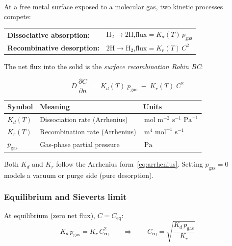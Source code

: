 \documentclass[11pt,a4paper]{article}
\newcommand{\pder}[2]{\frac{\partial #1}{\partial #2}}
\newcommand{\mol}{\,\text{mol}}
\newcommand{\m}{\,\text{m}}
\newcommand{\s}{\,\text{s}}
\newcommand{\Pa}{\,\text{Pa}}
\begin{document}
At a free metal surface exposed to a molecular gas, two kinetic processes
compete:

\begin{center}
\begin{tabular}{ll}
\textbf{Dissociative absorption:} & H$_2 \to 2$H,\quad $\text{flux} = K_d(T)\,p_\text{gas}$ \\
\textbf{Recombinative desorption:} & $2\text{H} \to \text{H}_2$,\quad $\text{flux} = K_r(T)\,C^2$ \\
\end{tabular}
\end{center}

The net flux into the solid is the \emph{surface recombination Robin BC}:

\begin{tcolorbox}[eqbox,title={Surface recombination BC (\texttt{surfaceRecombination})}]
\begin{equation}\label{eq:recomb}
  D\,\pder{C}{n}
  \;=\;
  K_d(T)\;p_\text{gas}
  \;-\;
  K_r(T)\;C^2
\end{equation}
\end{tcolorbox}

\begin{center}
\begin{tabular}{lll}
\toprule
Symbol & Meaning & Units \\
\midrule
$K_d(T)$ & Dissociation rate (Arrhenius) & $\mol\,\m^{-2}\,\s^{-1}\,\Pa^{-1}$ \\
$K_r(T)$ & Recombination rate (Arrhenius) & $\m^4\,\mol^{-1}\,\s^{-1}$ \\
$p_\text{gas}$ & Gas-phase partial pressure & $\Pa$ \\
\bottomrule
\end{tabular}
\end{center}

Both $K_d$ and $K_r$ follow the Arrhenius form~\eqref{eq:arrhenius}.
Setting $p_\text{gas} = 0$ models a vacuum or purge side (pure desorption).

\subsubsection{Equilibrium and Sieverts limit}

At equilibrium (zero net flux), $C = C_\text{eq}$:
\begin{equation}\label{eq:Ceq}
  K_d\,p_\text{gas} = K_r\,C_\text{eq}^2
  \qquad\Rightarrow\qquad
  C_\text{eq} = \sqrt{\frac{K_d\,p_\text{gas}}{K_r}}
\end{equation}
\end{document}
